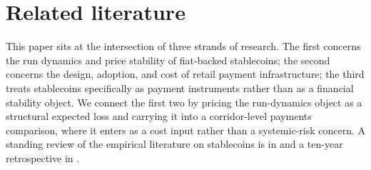 \section{Related literature}\label{sec:literature}

This paper sits at the intersection of three strands of research. The first concerns the run dynamics and price stability of fiat-backed stablecoins; the second concerns the design, adoption, and cost of retail payment infrastructure; the third treats stablecoins specifically as payment instruments rather than as a financial stability object. We connect the first two by pricing the run-dynamics object as a structural expected loss and carrying it into a corridor-level payments comparison, where it enters as a cost input rather than a systemic-risk concern. A standing review of the empirical literature on stablecoins is in \citet{ante_fiedler_etal_2023} and a ten-year retrospective in \citet{dionysopoulos_urquhart_2024}.

